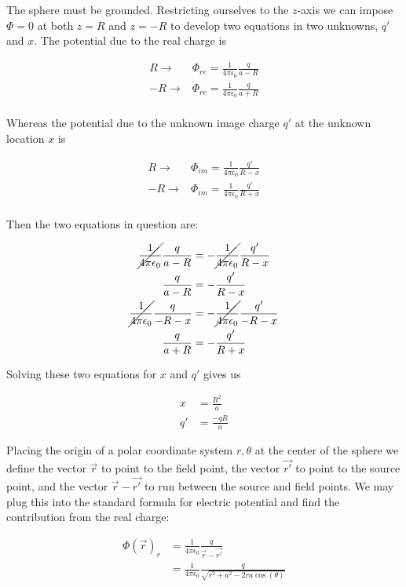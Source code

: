 \documentclass[paper=a4, fontsize=11pt]{scrartcl} %
\newcommand{\kay}{\frac{1}{4 \pi \epsilon_0}}
\newcommand{\scrr}{\vec{r} - \vec{r'}}
\numberwithin{equation}{section} %
\numberwithin{figure}{section} %
\numberwithin{table}{section} %
\begin{document}
\hspace{2mm}

The sphere must be grounded. Restricting ourselves to the $z$-axis we can impose $\Phi=0$ at both $z = R$ and $z= -R$ to develop two equations in two unknowns, $q'$ and $x$. The potential due to the real charge is 

\begin{align}
R \rightarrow & \Phi_{re} = \kay \frac{q}{a - R} \\ 
-R \rightarrow & \Phi_{re} = \kay \frac{q}{a + R}  \\
\end{align}

Whereas the potential due to the unknown image charge $q'$ at the unknown location $x$ is

\begin{align}
R \rightarrow & \Phi_{im} = \kay \frac{q'}{R - x} \\
-R \rightarrow & \Phi_{im} = \kay \frac{q'}{R + x} \\
\end{align}

Then the two equations in question are:

\begin{align}
\cancel{\kay} \frac{q}{a-R} &=- \cancel{\kay}\frac{q'}{R-x} \\
\frac{q}{a-R} &= -\frac{q'}{R-x} \\
\cancel{\kay} \frac{q}{-R-x} &=- \cancel{\kay}\frac{q'}{-R-x} \\
\frac{q}{a+R} &= -\frac{q'}{R+x}
\end{align}

Solving these two equations for $x$ and $q'$ gives us

\begin{align}
x &= \frac{R^2}{a} \\
q'&= \frac{-qR}{a} 
\end{align}



Placing the origin of a polar coordinate system $r, \theta$ at the center of the sphere we define the vector $\vec{r}$ to point to the field point, the vector $\vec{r'}$ to point to the source point, and the vector $\scrr$ to run between the source and field points. We may plug this into the standard formula for electric potential and find the contribution from the real charge:

\begin{align}
\Phi(\vec{r})_r &= \kay \frac{q}{\vec{r} - \vec{r'}} \\ 
&= \kay \frac{q}{\sqrt{r^2 + a^2 - 2 r a \cos(\theta)}} \\ 
\end{align}
\end{document}

